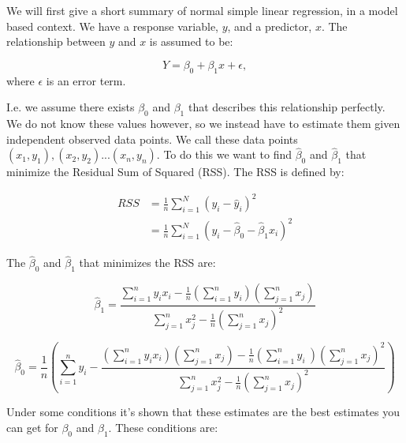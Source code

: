\documentclass{article}
\begin{document}
We will first give a short summary of normal simple linear regression, in a
model based context. We have a response variable, $y$, and a predictor, $x$. The
relationship between $y$ and $x$ is assumed to be:

\begin{equation*}
Y = \beta_0 + \beta_1 x + \epsilon,
\end{equation*}
where $\epsilon$ is an error term.

I.e. we assume there exists $\beta_0$ and $\beta_1$ that describes this
relationship perfectly.
We do not know these values however, so we instead have to estimate them given
independent observed data points. We call these data points $(x_1, y_1), (x_2, y_2)
... (x_n, y_n)$. To do
this we want to find $\hat{\beta}_0$ and $\hat{\beta}_1$ that minimize the
Residual Sum of Squared (RSS). The RSS is defined by:

\begin{align*}
  RSS &= \frac{1}{n} \sum_{i = 1}^N \left( y_i - \hat{y}_i \right)^2 \\
  &= \frac{1}{n} \sum_{i = 1}^N \left( y_i - \hat{\beta}_0 - \hat{\beta}_1 x_i \right)^2
\end{align*}

The $\hat{\beta}_0$ and $\hat{\beta}_1$ that minimizes the RSS are:

\begin{equation*}
\hat{\beta}_1 = \frac{\sum_{i = 1}^n y_i x_i - \frac{1}{n} \left( \sum_{i = 1}^n
    y_i \right)  \left( \sum_{j = 1}^n x_j \right)}
  {\sum_{j = 1}^n x_j^2 - \frac{1}{n} \left( \sum_{j = 1}^n x_j \right)^2}
\end{equation*}

\begin{equation*}
\hat{\beta}_0 = \frac{1}{n} \left( \sum_{i = 1}^n y_i -
  \frac{\left( \sum_{i = 1}^n y_i x_i  \right) \left( \sum_{j = 1}^n
    x_j  \right) - \frac{1}{n} \left( \sum_{i = 1}^n y_i \ \right) \left( \sum_{j = 1}^n x_j \right)^2}
  {\sum_{j = 1}^n x_j^2 - \frac{1}{n} \left( \sum_{j = 1}^n x_j \right)^2}
\right)
\end{equation*}


Under some conditions it's shown that these estimates are the best estimates
you can get for $\beta_0$ and $\beta_1$. These conditions are:
\end{document}
